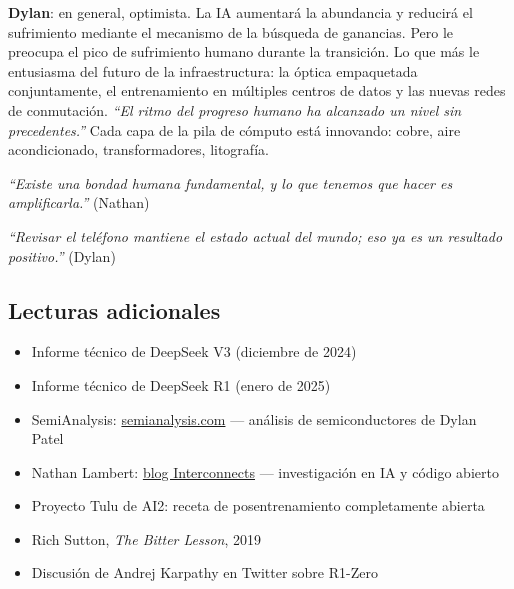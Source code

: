 \documentclass[a4paper]{article}
\begin{document}
\textbf{Dylan}: en general, optimista. La IA aumentará la abundancia y reducirá el sufrimiento mediante el mecanismo de la búsqueda de ganancias. Pero le preocupa el pico de sufrimiento humano durante la transición. Lo que más le entusiasma del futuro de la infraestructura: la óptica empaquetada conjuntamente, el entrenamiento en múltiples centros de datos y las nuevas redes de conmutación. \textit{``El ritmo del progreso humano ha alcanzado un nivel sin precedentes.''} Cada capa de la pila de cómputo está innovando: cobre, aire acondicionado, transformadores, litografía.

\textit{``Existe una bondad humana fundamental, y lo que tenemos que hacer es amplificarla.''} (Nathan)

\textit{``Revisar el teléfono mantiene el estado actual del mundo; eso ya es un resultado positivo.''} (Dylan)

\subsection{Lecturas adicionales}

\begin{itemize}
    \item Informe técnico de DeepSeek V3 (diciembre de 2024)
    \item Informe técnico de DeepSeek R1 (enero de 2025)
    \item SemiAnalysis: \href{https://semianalysis.com}{semianalysis.com} — análisis de semiconductores de Dylan Patel
    \item Nathan Lambert: \href{https://www.interconnects.ai}{blog Interconnects} — investigación en IA y código abierto
    \item Proyecto Tulu de AI2: receta de posentrenamiento completamente abierta
    \item Rich Sutton, \textit{The Bitter Lesson}, 2019
    \item Discusión de Andrej Karpathy en Twitter sobre R1-Zero
\end{itemize}
\end{document}
